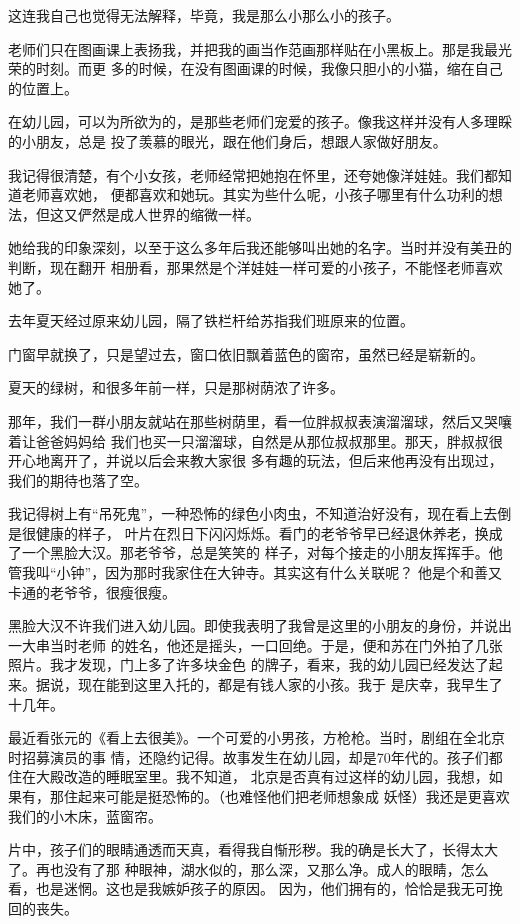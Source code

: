 		这连我自己也觉得无法解释，毕竟，我是那么小那么小的孩子。

		老师们只在图画课上表扬我，并把我的画当作范画那样贴在小黑板上。那是我最光荣的时刻。而更
	多的时候，在没有图画课的时候，我像只胆小的小猫，缩在自己的位置上。

		在幼儿园，可以为所欲为的，是那些老师们宠爱的孩子。像我这样并没有人多理睬的小朋友，总是
	投了羡慕的眼光，跟在他们身后，想跟人家做好朋友。

		我记得很清楚，有个小女孩，老师经常把她抱在怀里，还夸她像洋娃娃。我们都知道老师喜欢她，
	便都喜欢和她玩。其实为些什么呢，小孩子哪里有什么功利的想法，但这又俨然是成人世界的缩微一样。

		她给我的印象深刻，以至于这么多年后我还能够叫出她的名字。当时并没有美丑的判断，现在翻开
	相册看，那果然是个洋娃娃一样可爱的小孩子，不能怪老师喜欢她了。

		去年夏天经过原来幼儿园，隔了铁栏杆给苏指我们班原来的位置。

		门窗早就换了，只是望过去，窗口依旧飘着蓝色的窗帘，虽然已经是崭新的。

		夏天的绿树，和很多年前一样，只是那树荫浓了许多。

		那年，我们一群小朋友就站在那些树荫里，看一位胖叔叔表演溜溜球，然后又哭嚷着让爸爸妈妈给
	我们也买一只溜溜球，自然是从那位叔叔那里。那天，胖叔叔很开心地离开了，并说以后会来教大家很
	多有趣的玩法，但后来他再没有出现过，我们的期待也落了空。

		我记得树上有“吊死鬼”，一种恐怖的绿色小肉虫，不知道治好没有，现在看上去倒是很健康的样子，
	叶片在烈日下闪闪烁烁。看门的老爷爷早已经退休养老，换成了一个黑脸大汉。那老爷爷，总是笑笑的
	样子，对每个接走的小朋友挥挥手。他管我叫“小钟”，因为那时我家住在大钟寺。其实这有什么关联呢？
	他是个和善又卡通的老爷爷，很瘦很瘦。

		黑脸大汉不许我们进入幼儿园。即使我表明了我曾是这里的小朋友的身份，并说出一大串当时老师
	的姓名，他还是摇头，一口回绝。于是，便和苏在门外拍了几张照片。我才发现，门上多了许多块金色
	的牌子，看来，我的幼儿园已经发达了起来。据说，现在能到这里入托的，都是有钱人家的小孩。我于
	是庆幸，我早生了十几年。

		最近看张元的《看上去很美》。一个可爱的小男孩，方枪枪。当时，剧组在全北京时招募演员的事
	情，还隐约记得。故事发生在幼儿园，却是70年代的。孩子们都住在大殿改造的睡眠室里。我不知道，
	北京是否真有过这样的幼儿园，我想，如果有，那住起来可能是挺恐怖的。（也难怪他们把老师想象成
	妖怪）我还是更喜欢我们的小木床，蓝窗帘。

		片中，孩子们的眼睛通透而天真，看得我自惭形秽。我的确是长大了，长得太大了。再也没有了那
	种眼神，湖水似的，那么深，又那么净。成人的眼睛，怎么看，也是迷惘。这也是我嫉妒孩子的原因。
	因为，他们拥有的，恰恰是我无可挽回的丧失。

